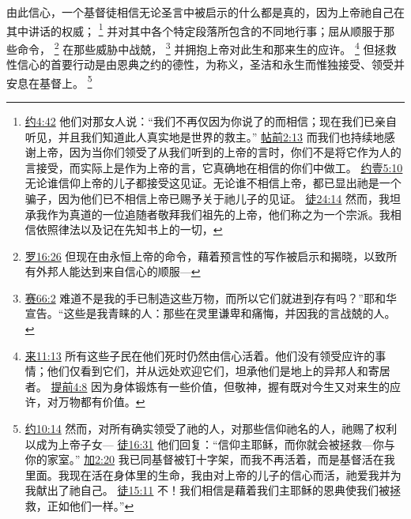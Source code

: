 \documentclass[12pt, a4paper, oneside]{ctexart}
\newcounter{parnum}[section]
\newcommand{\N}{%
   \noindent\refstepcounter{parnum}%
    \makebox[\parindent][l]{\textbf{\arabic{parnum}.}}}
\begin{document}
\N 由此信心，一个基督徒相信无论圣言中被启示的什么都是真的，因为上帝祂自己在其中讲话的权威；
	\footnote {
		\href{https://biblehub.com/john/4-42.htm}{约4:42} 他们对那女人说：“我们不再仅因为你说了的而相信；现在我们已亲自听见，并且我们知道此人真实地是世界的救主。”
		\href{https://biblehub.com/1_thessalonians/2-13.htm}{帖前2:13} 而我们也持续地感谢上帝，因为当你们领受了从我们听到的上帝的言时，你们不是将它作为人的言接受，而实际上是作为上帝的言，它真确地在相信的你们中做工。
		\href{https://biblehub.com/1_john/5-10.htm}{约壹5:10} 无论谁信仰上帝的儿子都接受这见证。无论谁不相信上帝，都已显出祂是一个骗子，因为他们已不相信上帝已赐予关于祂儿子的见证。
		\href{https://biblehub.com/acts/24-14.htm}{徒24:14} 然而，我坦承我作为真道的一位追随者敬拜我们祖先的上帝，他们称之为一个宗派。我相信依照律法以及记在先知书上的一切，
	}
	并对其中各个特定段落所包含的不同地行事；屈从顺服于那些命令，
	\footnote {
		\href{https://biblehub.com/romans/16-26.htm}{罗16:26} 但现在由永恒上帝的命令，藉着预言性的写作被启示和揭晓，以致所有外邦人能达到来自信心的顺服---
	}
	在那些威胁中战兢，
	\footnote {
		\href{https://biblehub.com/isaiah/66-2.htm}{赛66:2} 难道不是我的手已制造这些万物，而所以它们就进到存有吗？”耶和华宣告。“这些是我青睐的人：那些在灵里谦卑和痛悔，并因我的言战兢的人。
	}
	并拥抱上帝对此生和那来生的应许。
	\footnote {
		\href{https://biblehub.com/hebrews/11-13.htm}{来11:13} 所有这些子民在他们死时仍然由信心活着。他们没有领受应许的事情；他们仅看到它们，并从远处欢迎它们，坦承他们是地上的异邦人和寄居者。
		\href{https://biblehub.com/1_timothy/4-8.htm}{提前4:8} 因为身体锻炼有一些价值，但敬神，握有既对今生又对来生的应许，对万物都有价值。
	}
	但拯救性信心的首要行动是由恩典之约的德性，为称义，圣洁和永生而惟独接受、领受并安息在基督上。
	\footnote {
		\href{https://biblehub.com/john/1-12.htm}{约10:14} 然而，对所有确实领受了祂的人，对那些信仰祂名的人，祂赐了权利以成为上帝子女---
		\href{https://biblehub.com/acts/16-31.htm}{徒16:31} 他们回复：“信仰主耶稣，而你就会被拯救---你与你的家室。”
		\href{https://biblehub.com/galatians/2-20.htm}{加2:20} 我已同基督被钉十字架，而我不再活着，而是基督活在我里面。我现在活在身体里的生命，我由对上帝的儿子的信心而活，祂爱我并为我献出了祂自己。
		\href{https://biblehub.com/acts/15-11.htm}{徒15:11} 不！我们相信是藉着我们主耶稣的恩典使我们被拯救，正如他们一样。”
	}
\end{document}
